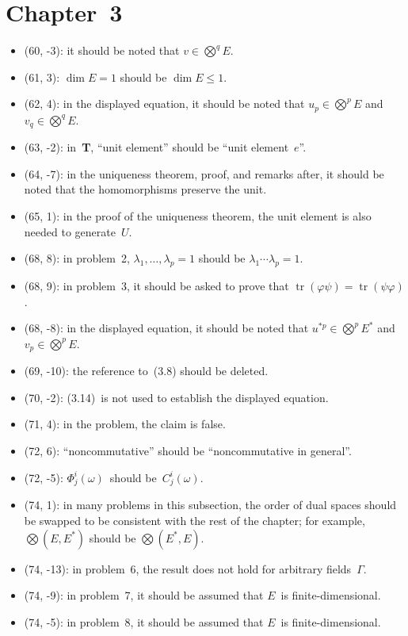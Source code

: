 \documentclass[letterpaper,12pt]{article}
\DeclareMathOperator{\tr}{tr}
\newcommand{\bigtprod}{\bigotimes}
\begin{document}
\section*{Chapter~3}
\begin{itemize}
\item (60, -3): it should be noted that \(v\in\bigtprod^q E\).
\item (61, 3): \(\dim E=1\) should be \(\dim E\le 1\).
\item (62, 4): in the displayed equation, it should be noted that \(u_p\in\bigtprod^p E\) and \(v_q\in\bigtprod^q E\).
\item (63, -2): in~\textbf{T}, ``unit element'' should be ``unit element~\(e\)''.
\item (64, -7): in the uniqueness theorem, proof, and remarks after, it should be noted that the homomorphisms preserve the unit.
\item (65, 1): in the proof of the uniqueness theorem, the unit element is also needed to generate~\(U\).
\item (68, 8): in problem~2, \(\lambda_1,\ldots,\lambda_p=1\) should be \(\lambda_1\cdots\lambda_p=1\).
\item (68, 9): in problem~3, it should be asked to prove that \(\tr(\varphi\psi)=\tr(\psi\varphi)\).
\item (68, -8): in the displayed equation, it should be noted that \(u^{*p}\in\bigtprod^p E^*\) and \(v_p\in\bigtprod^p E\).
\item (69, -10): the reference to~(3.8) should be deleted.
\item (70, -2): (3.14)~is not used to establish the displayed equation.
\item (71, 4): in the problem, the claim is false.
\item (72, 6): ``noncommutative'' should be ``noncommutative in general''.
\item (72, -5): \(\Phi^i_j(\omega)\)~should be~\(C^i_j(\omega)\).
\item (74, 1): in many problems in this subsection, the order of dual spaces should be swapped to be consistent with the rest of the chapter; for example, \(\bigtprod(E,E^*)\) should be \(\bigtprod(E^*,E)\).
\item (74, -13): in problem~6, the result does not hold for arbitrary fields~\(\Gamma\).
\item (74, -9): in problem~7, it should be assumed that \(E\)~is finite-dimensional.
\item (74, -5): in problem~8, it should be assumed that \(E\)~is finite-dimensional.

\end{itemize}
\end{document}
